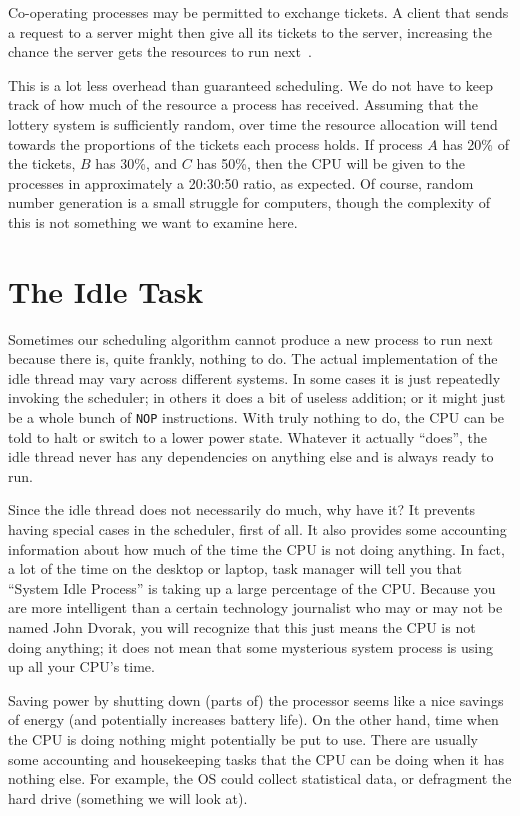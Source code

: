 Co-operating processes may be permitted to exchange tickets. A client that sends a request to a server might then give all its tickets to the server, increasing the chance the server gets the resources to run next~\cite{mos}.

This is a lot less overhead than guaranteed scheduling. We do not have to keep track of how much of the resource a process has received. Assuming that the lottery system is sufficiently random, over time the resource allocation will tend towards the proportions of the tickets each process holds. If process $A$ has 20\% of the tickets, $B$ has 30\%, and $C$ has 50\%, then the CPU will be given to the processes in approximately a 20:30:50 ratio, as expected. Of course, random number generation is a small struggle for computers, though the complexity of this is not something we want to examine here.


\section*{The Idle Task}

Sometimes our scheduling algorithm cannot produce a new process to run next because there is, quite frankly, nothing to do. The actual implementation of the idle thread may vary across different systems. In some cases it is just repeatedly invoking the scheduler; in others it does a bit of useless addition; or it might just be a whole bunch of \texttt{NOP} instructions. With truly nothing to do, the CPU can be told to halt or switch to a lower power state. Whatever it actually ``does'', the idle thread never has any dependencies on anything else and is always ready to run.

Since the idle thread does not necessarily do much, why have it? It prevents having special cases in the scheduler, first of all. It also provides some accounting information about how much of the time the CPU is not doing anything. In fact, a lot of the time on the desktop or laptop, task manager will tell you that ``System Idle Process'' is taking up a large percentage of the CPU. Because you are more intelligent than a certain technology journalist who may or may not be named John Dvorak, you will recognize that this just means the CPU is not doing anything; it does not mean that some mysterious system process is using up all your CPU's time.

Saving power by shutting down (parts of) the processor seems like a nice savings of energy (and potentially increases battery life). On the other hand, time when the CPU is doing nothing might potentially be put to use. There are usually some accounting and housekeeping tasks that the CPU can be doing when it has nothing else. For example, the OS could collect statistical data, or defragment the hard drive (something we will look at).



